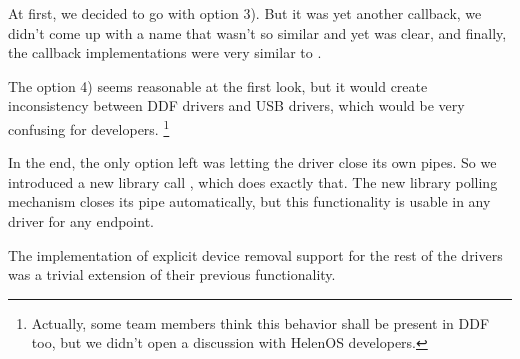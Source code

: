 At first, we decided to go with option 3). But it was yet another callback, we
didn't come up with a name that wasn't so similar and yet was clear, and
finally, the  callback implementations were very similar
to .

The option 4) seems reasonable at the first look, but it would create
inconsistency between DDF drivers and USB drivers, which would be very
confusing for developers. \footnote{Actually, some team members think this
behavior shall be present in DDF too, but we didn't open a discussion with
HelenOS developers.}

In the end, the only option left was letting the driver close its own pipes. So
we introduced a new library call , which does
exactly that. The new library polling mechanism closes its pipe automatically,
but this functionality is usable in any driver for any endpoint.

The implementation of explicit device removal support for the rest of the
drivers was a trivial extension of their previous functionality.

